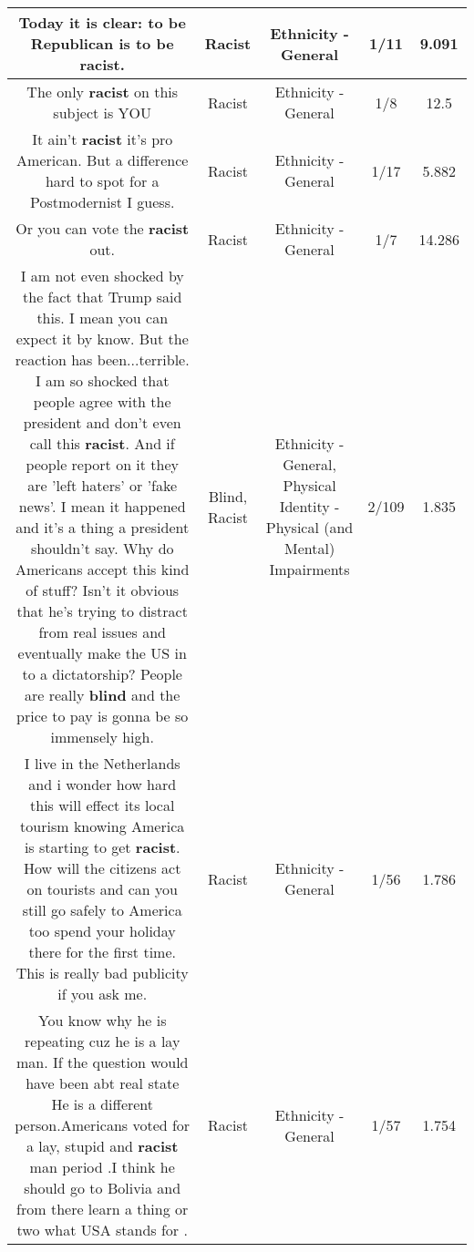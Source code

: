 \documentclass[11pt]{article}
\newlength\mylength
\begin{document}
\begin{center}
\begin{longtable}{|C{.65\mylength}|C{.30\mylength}|C{.12\mylength}|C{.12\mylength}|C{.12\mylength}|}
  \small Today it is clear:  to be Republican is to be \textbf{racist}.\normalsize   & Racist & Ethnicity - General & 1/11 & 9.091 \\  \hline
  \small The only \textbf{racist} on this subject is YOU\normalsize   & Racist & Ethnicity - General & 1/8 & 12.5 \\  \hline
  \small It ain't \textbf{racist} it's pro American. But a difference hard to spot for a Postmodernist I guess.\normalsize   & Racist & Ethnicity - General & 1/17 & 5.882 \\  \hline
  \small Or you can vote the \textbf{racist} out.\normalsize   & Racist & Ethnicity - General & 1/7 & 14.286 \\  \hline
  \small I am not even shocked by the fact that Trump said this. I mean you can expect it by know. But the reaction has been...terrible. I am so shocked that people agree with the president and don't even call this \textbf{racist}. And if people report on it they are 'left haters' or 'fake news'. I mean it happened and it's a thing a president shouldn't say. Why do Americans accept this kind of stuff? Isn't it obvious that he's trying to distract from real issues and eventually make the US in to a dictatorship? People are really \textbf{blind} and the price to pay  is gonna be so immensely high.\normalsize   & Blind, Racist & Ethnicity - General, Physical Identity - Physical (and Mental) Impairments & 2/109 & 1.835 \\  \hline
  \small I live in the Netherlands and i wonder how hard this will effect its local tourism knowing America is starting to get \textbf{racist}. How will the citizens act on tourists and can you still go safely to America too spend your holiday there for the first time.  This is really bad publicity if you ask me.\normalsize   & Racist & Ethnicity - General & 1/56 & 1.786 \\  \hline
  \small You know why he is repeating cuz he is a lay man. If the question would have been abt real state He is a different person.Americans voted for a lay, stupid and \textbf{racist} man period .I think he should go to Bolivia and from there learn a thing or two what USA stands for .\normalsize   & Racist & Ethnicity - General & 1/57 & 1.754 \\  \hline

\end{longtable}
\end{center}
\end{document}
